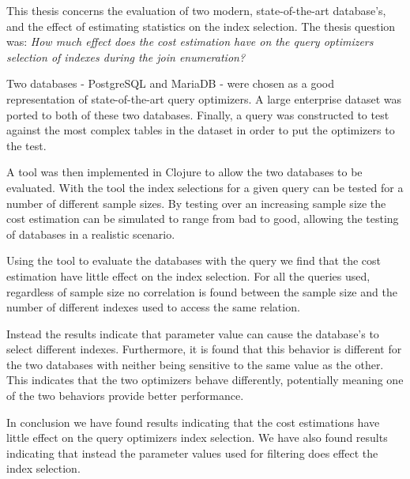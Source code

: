 This thesis concerns the evaluation of two modern, state-of-the-art database's,
and the effect of estimating statistics on the index selection. The thesis question was:
\textit{How much effect does the cost estimation have on the query optimizers selection of indexes during the join enumeration?}

Two databases - PostgreSQL and MariaDB - were chosen as a good representation of state-of-the-art query
optimizers. A large enterprise dataset was ported to both of these two
databases. Finally, a query was constructed to test against the most complex
tables in the dataset in order to put the optimizers to the test.

A tool was then implemented in Clojure to allow the two databases to be evaluated.
With the tool the index selections for a given query can be tested
for a number of different sample sizes. By testing over an increasing sample
size the cost estimation can be simulated to range from bad to good, allowing
the testing of databases in a realistic scenario.

Using the tool to evaluate the databases with the query we find that the cost
estimation have little effect on the index selection. For all the queries used,
regardless of sample size no correlation is found between the sample size and the number of
different indexes used to access the same relation.

Instead the results indicate that parameter value can cause the database's to
select different indexes. Furthermore, it is found that this behavior is
different for the two databases with neither being sensitive to the same value
as the other. This indicates that the two optimizers behave differently,
potentially meaning one of the two behaviors provide better performance.

In conclusion we have found results indicating that the cost estimations have
little effect on the query optimizers index selection. We have also found
results indicating that instead the parameter values used for filtering does
effect the index selection.